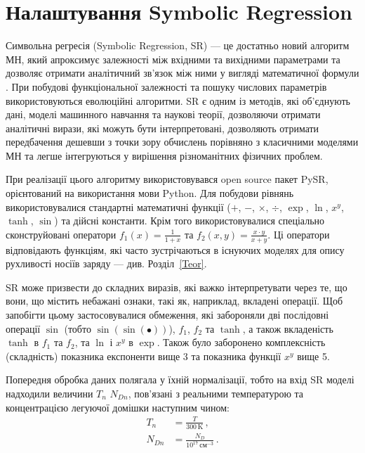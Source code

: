 \documentclass[12pt,a4paper,titlepage,oneside]{book}
\numberwithin{equation}{part}
\begin{document}
\section{Налаштування Symbolic Regression}

Символьна регресія (Symbolic Regression, SR) --- це достатньо новий алгоритм МН, який апроксимує
залежності між вхідними та вихідними параметрами та дозволяє отримати аналітичний зв'язок між ними у вигляді математичної формули \cite{Angelis2023}.
При побудові функціональної залежності та пошуку числових параметрів використовуються еволюційні алгоритми.
SR є одним із методів, які об'єднують дані, моделі машинного навчання та наукові теорії, дозволяючи отримати аналітичні вирази,
які можуть бути інтерпретовані, дозволяють отримати передбачення дешевши з точки зору обчислень порівняно з класичними моделями МН
та легше інтегруються у вирішення різноманітних фізичних проблем.

При реалізації цього алгоритму використовувався open source пакет PySR, орієнтований на використання мови Python.
Для побудови рівнянь використовувалися стандартні математичні функції
($+$, $-$, $\times$, $\div$, $\exp$, $\ln$, $x^y$, $\tanh$, $\sin$) та дійсні константи.
Крім того використовувалися спеціально сконструйовані оператори
$f_1(x)=\frac{1}{1+x}$ та $f_2(x,y)=\frac{x\cdot y}{x+y}$.
Ці оператори відповідають функціям, які часто зустрічаються в існуючих моделях для опису рухливості носіїв заряду --- див. Розділ~\ref{Teor}.


SR може призвести до складних виразів, які важко інтерпретувати через те, що вони, що містить небажані ознаки, такі як, наприклад,
вкладені операції.
Щоб запобігти цьому застосовувалися обмеження, які забороняли
дві послідовні операції $\sin$ (тобто $\sin(\sin(\bullet))$), $f_1$, $f_2$ та $\tanh$,
а також вкладеність $\tanh$ в $f_1$ та $f_2$,
та $\ln$ і $x^y$ в $\exp$.
Також було заборонено комплексність (складність) показника експоненти вище 3 та показника функції $x^y$ вище 5.

Попередня обробка даних полягала у їхній нормалізації, тобто на вхід SR моделі надходили величини $T_n$ $N_{Dn}$,
пов'язані з реальними температурою та концентрацією легуючої домішки наступним чином:
\begin{subequations} \label{eqNorm}
    \begin{align}
      T_n& = \frac{T}{300\,\text{K}}\,, \label{eqNorma} \\
      N_{Dn}& = \frac{N_D}{10^{17}\,\text{см}^{-3}}\,. \label{eqNormb}
    \end{align}
\end{subequations}
\end{document}
